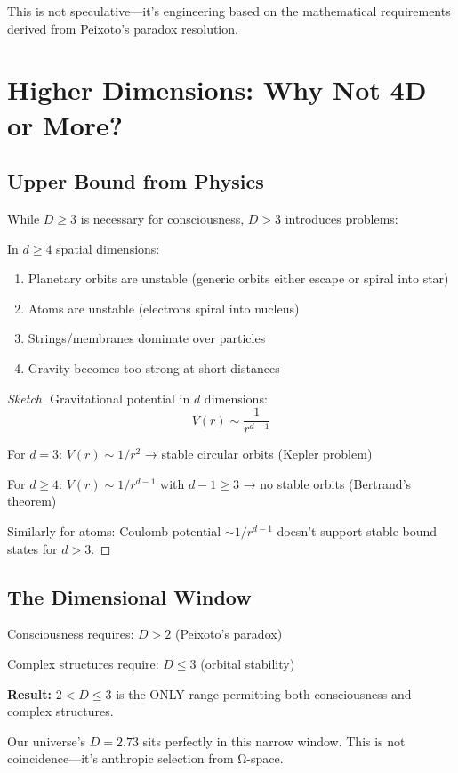 This is not speculative—it's engineering based on the mathematical requirements derived from Peixoto's paradox resolution.

\section{Higher Dimensions: Why Not 4D or More?}

\subsection{Upper Bound from Physics}

While $D \geq 3$ is necessary for consciousness, $D > 3$ introduces problems:

\begin{prop}
In $d \geq 4$ spatial dimensions:
\begin{enumerate}
\item Planetary orbits are unstable (generic orbits either escape or spiral into star)
\item Atoms are unstable (electrons spiral into nucleus)
\item Strings/membranes dominate over particles
\item Gravity becomes too strong at short distances
\end{enumerate}
\end{prop}

\begin{proof}[Sketch]
Gravitational potential in $d$ dimensions:
\begin{equation}
V(r) \sim \frac{1}{r^{d-1}}
\end{equation}

For $d = 3$: $V(r) \sim 1/r^2$ → stable circular orbits (Kepler problem)

For $d \geq 4$: $V(r) \sim 1/r^{d-1}$ with $d-1 \geq 3$ → no stable orbits (Bertrand's theorem)

Similarly for atoms: Coulomb potential $\sim 1/r^{d-1}$ doesn't support stable bound states for $d > 3$.
\end{proof}

\subsection{The Dimensional Window}

\begin{keyidea}
Consciousness requires: $D > 2$ (Peixoto's paradox)

Complex structures require: $D \leq 3$ (orbital stability)

\textbf{Result:} $2 < D \leq 3$ is the ONLY range permitting both consciousness and complex structures.

Our universe's $D = 2.73$ sits perfectly in this narrow window. This is not coincidence—it's anthropic selection from Ω-space.
\end{keyidea}

